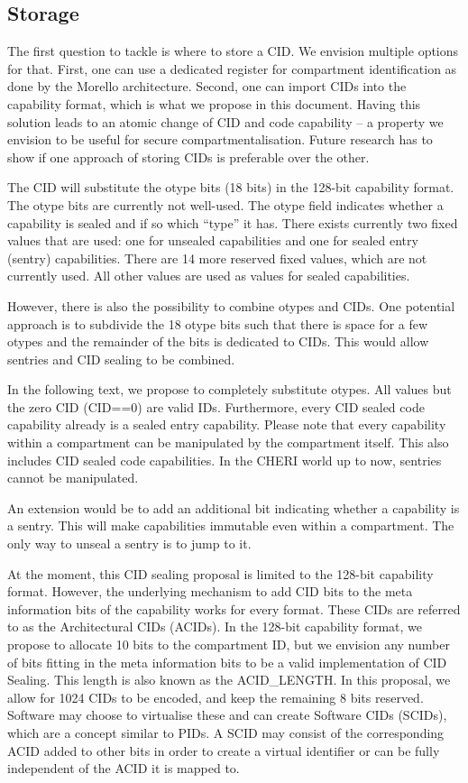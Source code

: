 \subsection{Storage}
\label{app:exp:subsec:storage}

The first question to tackle is where to store a CID.
We envision multiple options for that.
First, one can use a dedicated register for compartment identification as done by the Morello architecture.
Second, one can import CIDs into the capability format, which is what we propose in this document.
Having this solution leads to an atomic change of CID and code capability -- a property we envision to be useful for secure compartmentalisation.
Future research has to show if one approach of storing CIDs is preferable over the other.

The CID will substitute the otype bits (18 bits) in the 128-bit capability format.
The otype bits are currently not well-used. The otype field indicates whether a capability is sealed and if so which ``type'' it has.
There exists currently two fixed values that are used: one for unsealed capabilities and one for sealed entry (sentry) capabilities.
There are 14 more reserved fixed values, which are not currently used. All other values are used as values for sealed capabilities.

However, there is also the possibility to combine otypes and CIDs.
One potential approach is to subdivide the 18 otype bits such that there is space for a few otypes and the remainder of the bits is dedicated to CIDs.
This would allow sentries and CID sealing to be combined.

In the following text, we propose to completely substitute otypes.
All values but the zero CID (CID==0) are valid IDs.
Furthermore, every CID sealed code capability already is a sealed entry capability.
Please note that every capability within a compartment can be manipulated by the compartment itself.
This also includes CID sealed code capabilities.
In the CHERI world up to now, sentries cannot be manipulated.

An extension would be to add an additional bit indicating whether a capability is a sentry.
This will make capabilities immutable even within a compartment.
The only way to unseal a sentry is to jump to it.

At the moment, this CID sealing proposal is limited to the 128-bit capability format.
However, the underlying mechanism to add CID bits to the meta information bits of the capability works for every format.
These CIDs are referred to as the Architectural CIDs (ACIDs).
In the 128-bit capability format, we propose to allocate 10 bits to the compartment ID, but we envision any number of bits fitting in the meta information bits to be a valid implementation of CID Sealing.
This length is also known as the ACID\_LENGTH.
In this proposal, we allow for 1024 CIDs to be encoded, and keep the remaining 8 bits reserved.
Software may choose to virtualise these and can create Software CIDs (SCIDs), which are a concept similar to PIDs.
A SCID may consist of the corresponding ACID added to other bits in order to create a virtual identifier or can be fully independent of the ACID it is mapped to.

